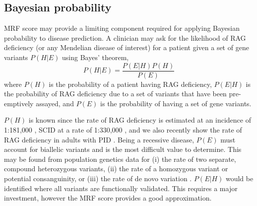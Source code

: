 \documentclass[preprint,11pt,fleqn]{elsarticle}
\begin{document}
\subsection*{\textbf{Bayesian probability}}
 \label{sec:Supplemental_Bayesian}
\noindent MRF score may provide a limiting component required for applying Bayesian probability to disease prediction.
A clinician may ask for the likelihood of RAG deficiency (or any Mendelian disease of interest) for a patient given a set of gene variants $P(H|E)$ using Bayes' theorem,
\begin{displaymath}
P(H|E) = \frac{P(E|H) P(H)}{P(E)}
\end{displaymath}
where $P(H)$ is the probability of a patient having RAG deficiency, $P(E | H)$  is the probability of RAG deficiency due to a set of variants that have been pre-emptively assayed, and $P(E)$ is the probability of having a set of gene variants.

$P(H)$ is known since the rate of RAG deficiency is
estimated at an incidence of 1:181,000
\citep{kumanovics2017estimated},
SCID at a rate of 1:330,000 \citep{kwan2014newborn},
and we also recently show the rate of RAG deficiency in adults with PID
\citep{lawless2018prevalence}.
Being a recessive disease, $P(E)$ must account for biallelic variants and is the most difficult value to determine. 
This may be found from population genetics data for (i) the rate of two separate, compound heterozygous variants, (ii) the rate of a homozygous variant or potential consanguinity, or (iii) the rate of de novo variation
\citep{lek2016analysis}. 
$P(E|H)$ would be identified where all variants are functionally validated. 
This requires a major investment, however the MRF score provides a good approximation.
\end{document}
